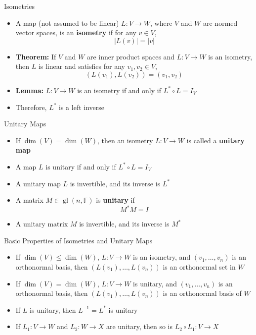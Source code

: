 \documentclass[usenames,dvipsnames,10pt]{beamer}
\newcommand\F{\mathbb{F}}
\newcommand{\gl}{\operatorname{gl}}
\begin{document}
\begin{frame}
  {Isometries}

  \begin{itemize}
  \item A map (not assumed to be linear) $L: V \rightarrow W$, where $V$ and $W$ are normed vector spaces, is an {\bf isometry} if for any $v \in V$,
    \[
      |L(v)| = |v|
    \]
  \item {\bf Theorem: }If $V$ and $W$ are inner product spaces and $L: V \rightarrow W$ is an isometry, then $L$ is linear and satisfies for any $v_1, v_2 \in V$,
    \[
      (L(v_1),L(v_2)) = (v_1,v_2)
    \]
  \item {\bf Lemma: }$L: V \rightarrow W$ is an isometry if and only if $L^*\circ L = I_V$
  \item Therefore, $L^*$ is a left inverse
  \end{itemize}
\end{frame}

\begin{frame}
  {Unitary Maps}

  \begin{itemize}
  \item If $\dim(V) = \dim(W)$, then an isometry $L: V \rightarrow W$ is called a {\bf unitary map}
  \item A map $L$ is unitary if and only if $L^*\circ L = I_V$
  \item A unitary map $L$ is invertible, and its inverse is $L^*$
  \item A matrix $M \in \gl(n,\F)$ is {\bf unitary} if
    \[ M^*M = I \]
  \item A unitary matrix $M$ is invertible, and its inverse is $M^*$
  \end{itemize}
\end{frame}

\begin{frame}
  {Basic Properties of Isometries and Unitary Maps}

  \begin{itemize}
  \item If $\dim(V) \le \dim(W)$, $L: V \rightarrow W$ is an isometry, and $(v_1, \dots, v_n)$ is an orthonormal basis, then $(L(v_1),\dots,L(v_n))$ is an orthonormal set in $W$
  \item If $\dim(V) = \dim(W)$, $L: V \rightarrow W$ is unitary, and $(v_1, \dots, v_n)$ is an orthonormal basis, then $(L(v_1),\dots,L(v_n))$ is an orthonormal basis of $W$
  \item If $L$ is unitary, then $L^{-1}=L^*$ is unitary
  \item If $L_1: V \rightarrow W$ and $L_2: W \rightarrow X$ are unitary, then so is $L_2\circ L_1: V \rightarrow X$
  \end{itemize}
\end{frame}
\end{document}
